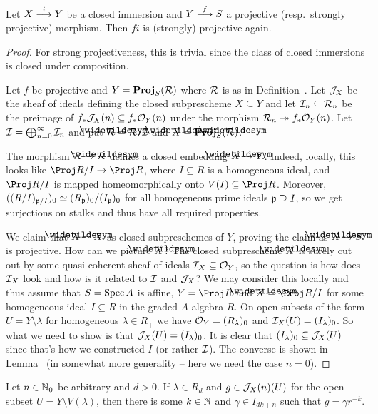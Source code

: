 \documentclass[a4paper,parskip=half,numbers=enddot, DIV=12]{scrreprt}
\begin{document}
\begin{prop}
	Let $X\morphism[i]Y$ be a closed immersion and $Y\morphism[f]S$ a projective (resp.\ strongly projective) morphism. Then $f i$ is (strongly) projective again.
\end{prop}
\begin{proof}
	For strong projectiveness, this is trivial since the class of closed immersions is closed under composition. 
	
	Let $f$ be projective and $Y=\operatorname{\mathbf{Proj}}_S(\mathcal{R})$ where $\mathcal{R}$ is as in Definition~. Let $\mathcal{J}_X$ be the sheaf of ideals defining the closed subprescheme $X\subseteq Y$ and let $\mathcal{I}_n\subseteq \mathcal{R}_n$ be the preimage of $f_*\mathcal{J}_X(n)\subseteq f_*\mathcal{O}_Y(n)$ under the morphism $\Rr_n\epimorphism f_*\Oo_Y(n)$. Let $\mathcal{I}=\bigoplus_{n=0}^\infty \mathcal{I}_n$ and put $\snake{\Rr}=\Rr/\Ii$ and $\snake{X}=\PROJ_S(\snake{\Rr})$. 
	
	The morphism $\Rr\morphism\snake{\Rr}$ defines a closed embedding $\snake{X}\morphism Y$. Indeed, locally, this looks like $\Proj R/I\morphism\Proj R$, where $I\subseteq R$ is a homogeneous ideal, and $\Proj R/I$ is mapped homeomorphically onto $V(I)\subseteq \Proj R$. Moreover, $((R/I)_{\mathfrak{p}/I})_0\simeq (R_{\mathfrak{p}})_0/(I_{\mathfrak{p}})_0$ for all homogeneous prime ideals $\mathfrak{p}\supseteq I$, so we get surjections on stalks and thus have all required properties.
	
	We claim that $\snake{X}=X$ as closed subpreschemes of $Y$, proving the claim as $\snake{X}\morphism S$ is projective. How can we picture $\snake{X}$? The closed subprescheme $\snake{X}$ is surely cut out by some quasi-coherent sheaf of ideals $\mathcal{I}_X\subseteq \mathcal{O}_Y$, so the question is how does $\mathcal{I}_X$ look and how is it related to $\mathcal{I}$ and $\mathcal{J}_X$? We may consider this locally and thus assume that $S=\operatorname{Spec} A$ is affine, $Y=\Proj R$ and $\snake{X}=\Proj R/I$ for some homogeneous ideal $I\subseteq R$ in the graded $A$-algebra $R$. On open subsets of the form $U=Y\setminus \lambda$ for homogeneous $\lambda\in R_+$ we have $\mathcal{O}_Y=(R_\lambda)_0$ and $\mathcal{I}_X(U)=(I_\lambda)_0$. So what we need to show is that $\mathcal{J}_X(U)=(I_\lambda)_0$. It is clear that $(I_\lambda)_0\subseteq \mathcal{J}_X(U)$ since that's how we constructed $I$ (or rather $\mathcal{I}$). The converse is shown in Lemma~ (in somewhat more generality -- here we need the case $n=0$).
\end{proof}
\begin{lem}
	Let $n\in\mathbb{N}_0$ be arbitrary and $d>0$. If $\lambda\in R_d$ and $g\in\mathcal{J}_X(n)(U)$ for the open subset $U=Y\setminus V(\lambda)$, then there is some $k\in\mathbb{N}$ and $\gamma\in I_{dk+n}$ such that $g=\gamma r^{-k}$.
\end{lem}
\end{document}
